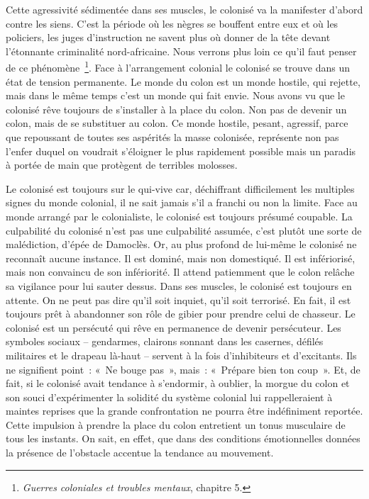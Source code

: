 \documentclass[french,twoside]{book} %
\begin{document}
Cette agressivité sédimentée dans ses muscles, le colonisé va la manifester d’abord contre les siens. C’est la période où les nègres se bouffent entre eux et où les policiers, les juges d’instruction ne savent plus où donner de la tête devant l’étonnante   criminalité nord-africaine. Nous verrons plus loin ce qu’il faut penser de ce phénomène \footnote{\emph{Guerres coloniales et troubles mentaux}, chapitre 5.}. Face à l’arrangement colonial le colonisé se trouve dans un état de tension permanente. Le monde du colon est un monde hostile, qui rejette, mais dans le même temps c’est un monde qui fait envie. Nous avons vu que le colonisé rêve toujours de s’installer à la place du colon. Non pas de devenir un colon, mais de se substituer au colon. Ce monde hostile, pesant, agressif, parce que repoussant de toutes ses aspérités la masse colonisée, représente non pas l’enfer duquel on voudrait s’éloigner le plus rapidement possible mais un paradis à portée de main que protègent de terribles molosses.\par
\bigbreak
\noindent Le colonisé est toujours sur le qui-vive car, déchiffrant difficilement les multiples signes du monde colonial, il ne sait jamais s’il a franchi ou non la limite. Face au monde arrangé par le colonialiste, le colonisé est toujours présumé coupable. La culpabilité du colonisé n’est pas une culpabilité assumée, c’est plutôt une sorte de malédiction, d’épée de Damoclès. Or, au plus profond de lui-même le colonisé ne reconnaît aucune instance. Il est dominé, mais non domestiqué. Il est infériorisé, mais non convaincu de son infériorité. Il attend patiemment que le colon relâche sa vigilance pour lui sauter dessus. Dans ses muscles, le colonisé est toujours en attente. On ne peut pas dire qu’il soit inquiet, qu’il soit terrorisé. En fait, il est toujours prêt à abandonner son rôle de gibier pour prendre celui de chasseur. Le colonisé est un persécuté qui rêve en permanence de devenir persécuteur. Les symboles sociaux – gendarmes, clairons sonnant dans les casernes, défilés militaires et le drapeau là-haut – servent à la fois d’inhibiteurs et d’excitants. Ils ne signifient point : « Ne bouge pas », mais : « Prépare bien ton coup ». Et, de fait, si le colonisé avait tendance à s’endormir, à oublier, la morgue du colon et son souci d’expérimenter la solidité du système colonial lui rappelleraient à maintes reprises que la grande   confrontation ne pourra être indéfiniment reportée. Cette impulsion à prendre la place du colon entretient un tonus musculaire de tous les instants. On sait, en effet, que dans des conditions émotionnelles données la présence de l’obstacle accentue la tendance au mouvement.\par
\end{document}
